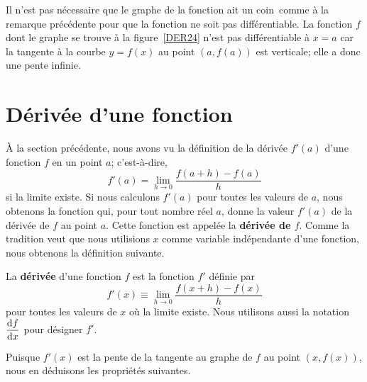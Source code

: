 {

\begin{rmk}
Il n'est pas nécessaire que le graphe de la fonction ait un \lgm
coin\rgm\ comme à la remarque précédente pour que la fonction ne soit
pas différentiable. La fonction $f$ dont le graphe se trouve à la
figure~\ref{DER24} n'est pas différentiable à $x=a$ car la
tangente à la courbe $y=f(x)$ au point $(a,f(a))$ est verticale; elle
a donc une pente infinie.
\end{rmk}


\section{Dérivée d'une fonction} \label{deff_der}

À la section précédente, nous avons vu la définition de la dérivée $f'(a)$
d'une fonction $f$ en un point $a$; c'est-à-dire,
\[
f'(a) = \lim_{h\rightarrow 0} \frac{f(a+h)-f(a)}{h}
\]
si la limite existe.  Si nous calculons $f'(a)$ pour toutes les valeurs de
$a$, nous obtenons la fonction qui, pour tout nombre réel $a$, donne la
valeur $f'(a)$ de la dérivée de $f$ au point $a$.  Cette fonction
est appelée la {\bfseries dérivée de $f$}.  Comme la tradition veut
que nous utilisions $x$ comme variable indépendante d'une fonction, nous
obtenons la définition suivante.

\begin{focus}{\dfn}  
La {\bfseries dérivée} d'une fonction $f$ est la fonction $f'$ définie
par
\[
f'(x) \equiv \lim_{h\rightarrow 0} \frac{f(x+h)-f(x)}{h}
\]
pour toutes les valeurs de $x$ où la limite existe.  Nous utilisons aussi
la notation $\displaystyle \frac{\mathrm{d}f}{\mathrm{d}x}$ pour désigner $f'$.
\end{focus}

Puisque $f'(x)$ est la pente de la tangente au graphe de $f$ au point
$(x,f(x))$, nous en déduisons les propriétés suivantes.

}
